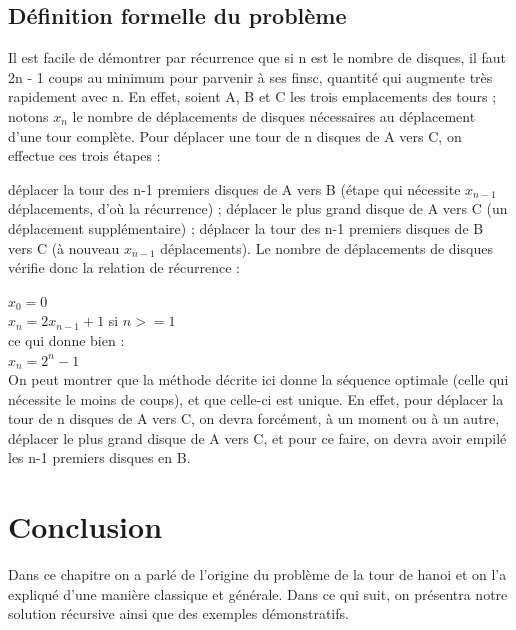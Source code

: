 \subsection{Définition formelle du problème}
Il est facile de démontrer par récurrence que si n est le nombre de disques, il faut 2n - 1 coups au minimum pour parvenir à ses finsc, quantité qui augmente très rapidement avec n. En effet, soient A, B et C les trois emplacements des tours ; notons $x_n$ le nombre de déplacements de disques nécessaires au déplacement d'une tour complète. Pour déplacer une tour de n disques de A vers C, on effectue ces trois étapes :

déplacer la tour des n-1 premiers disques de A vers B (étape qui nécessite $x_{n-1}$ déplacements, d’où la récurrence) ;
déplacer le plus grand disque de A vers C (un déplacement supplémentaire) ;
déplacer la tour des n-1 premiers disques de B vers C (à nouveau $x_{n-1}$ déplacements).
Le nombre de déplacements de disques vérifie donc la relation de récurrence :

\hspace*{6.4cm}                        $x_0 = 0$ \\
\hspace*{7cm}                        $x_n = 2x_{n-1}+1$ si $n >= 1$ \\
ce qui donne bien : \\
\hspace*{7cm}                        $x_n = 2^n - 1$ \\

On peut montrer que la méthode décrite ici donne la séquence optimale (celle qui nécessite le moins de coups), et que celle-ci est unique. En effet, pour déplacer la tour de n disques de A vers C, on devra forcément, à un moment ou à un autre, déplacer le plus grand disque de A vers C, et pour ce faire, on devra avoir empilé les n-1 premiers disques en B.

\section{Conclusion}
Dans ce chapitre on a parlé de l'origine du problème de la tour de hanoi et on l'a expliqué  d'une manière classique et générale. Dans ce qui suit, on présentra notre solution récursive ainsi que des exemples démonstratifs. 
